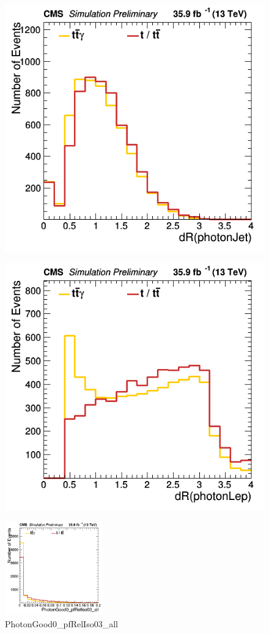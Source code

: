 \documentclass[11pt]{scrartcl}
\begin{document}
	\begin{figure}[H]
	\centering
	\begin{minipage}{.5\textwidth}
	  \centering
	  \includegraphics[width=0.75\linewidth]{figures/Select3/photonJetdR.png}
	  \label{fig:photonJetdR}
	\end{minipage}%
	\begin{minipage}{.5\textwidth}
	  \centering
	  \includegraphics[width=0.75\linewidth]{figures/Select3/photonLepdR.png}
	  \label{fig:photonLepdR}
	\end{minipage}
	\end{figure}

	\begin{figure}[H]
	\centering
	\includegraphics[width=0.38\textwidth]{figures/Select3/PhotonGood0_pfRelIso03_all.png}
	\caption{PhotonGood0\_pfRelIso03\_all}
 	\label{fig:PhotonGood0pfRelIso03all}
	\end{figure}
	
\end{document}
